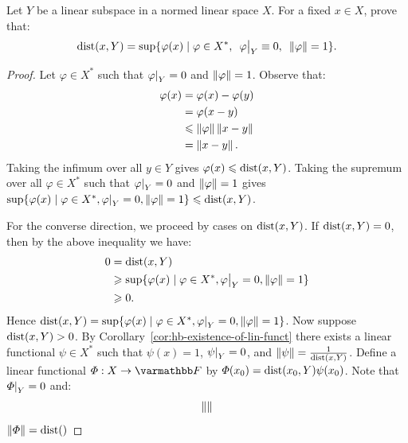 \begin{exercise}
Let $Y$ be a linear subspace in a normed linear space $X$. For a fixed $x \in X$, prove that:
    \begin{equation*}
    \begin{split}
        \dist(x,Y) = \sup \{ \varphi(x) \mid \varphi \in X^\ast,\h5 \restr{\varphi}{Y} \equiv 0,\h5 \lnorm \varphi \rnorm = 1\}. 
    \end{split}
    \end{equation*}
\end{exercise}
    \begin{proof}
        Let $\varphi \in X^\ast$ such that $\restr{\varphi}{Y} = 0$ and $\left\lVert \varphi \right\rVert = 1$. Observe that:
            \begin{equation*}
            \begin{split}
                \varphi(x) 
                & = \varphi(x) - \varphi(y) \\
                & = \varphi(x - y) \\
                & \leqslant \left\lVert \varphi \right\rVert \left\lVert x-y \right\rVert \\
                & = \left\lVert x-y \right\rVert.
            \end{split}
            \end{equation*}
        Taking the infimum over all $y \in Y$ gives $\varphi(x) \leqslant \operatorname{dist}(x,Y)$. Taking the supremum over all $\varphi \in X^\ast$ such that $\restr{\varphi}{Y} = 0$ and $\left\lVert \varphi \right\rVert = 1$ gives $\sup \{ \varphi(x) \mid \varphi \in X^\ast, \restr{\varphi}{Y} = 0, \lnorm \varphi \rnorm = 1\} \leq \dist(x,Y)$.

        For the converse direction, we proceed by cases on $\operatorname{dist}(x,Y)$. If $\operatorname{dist}(x,Y) = 0$, then by the above inequality we have:
            \begin{equation*}
            \begin{split}
                0 
                & = \dist(x,Y) \\
                & \geq \sup \{ \varphi(x) \mid \varphi \in X^\ast, \restr{\varphi}{Y} = 0, \lnorm \varphi \rnorm = 1\} \\
                & \geq 0.
            \end{split}
            \end{equation*}
        Hence $\dist(x,Y) = \sup \{ \varphi(x) \mid \varphi \in X^\ast, \restr{\varphi}{Y} = 0, \lnorm \varphi \rnorm = 1\}$. Now suppose $\operatorname{dist}(x,Y) > 0$. By Corollary~\ref{cor:hb-existence-of-lin-funct} there exists a linear functional $\psi \in X^\ast$ such that $\psi(x) = 1$, $\restr{\psi}{Y} = 0$, and $\left\lVert \psi \right\rVert = \frac{1}{\operatorname{dist}(x,Y)}$. Define a linear functional $\varPhi:X \rightarrow \bfF$ by $\varPhi(x_0) = \operatorname{dist}(x_0,Y) \psi(x_0)$. Note that $\restr{\varPhi}{Y} = 0$ and: 
            \begin{equation*}
            \begin{split}
                \left\lVert  \right\rVert
            \end{split}
            \end{equation*}
            $\left\lVert \varPhi \right\rVert = \operatorname{dist}()$
    \end{proof}


